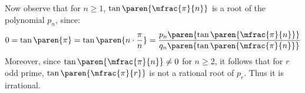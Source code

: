 Now observe that for $n \geq 1$,
$\tan\paren{\mfrac{\pi}{n}}$ is a root of the polynomial $p_n$, since:
\begin{equation*}
  0 = \tan\paren{\pi}
    = \tan\paren{n \cdot \frac{\pi}{n}}
    = \frac{p_n\paren{\tan\paren{\mfrac{\pi}{n}}}}
           {q_n\paren{\tan\paren{\mfrac{\pi}{n}}}}
\end{equation*}
Moreover, since $\tan\paren{\mfrac{\pi}{n}} \neq 0$ for $n \geq 2$,
it follows that for $r$ odd prime,
$\tan\paren{\mfrac{\pi}{r}}$ is not a rational root of $p_r$.
Thus it is irrational.
